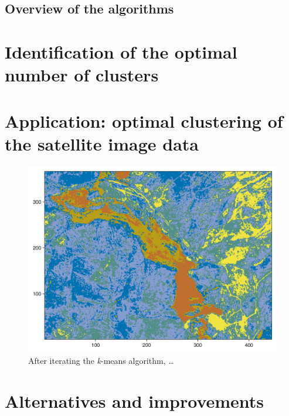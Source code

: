 \documentclass[
  letterpaper,
]{scrbook}
\begin{document}
\hypertarget{overview-of-the-algorithms}{%
\subsection{Overview of the
algorithms}\label{overview-of-the-algorithms}}

\hypertarget{identification-of-the-optimal-number-of-clusters}{%
\section{Identification of the optimal number of
clusters}\label{identification-of-the-optimal-number-of-clusters}}

\hypertarget{application-optimal-clustering-of-the-satellite-image-data}{%
\section{Application: optimal clustering of the satellite image
data}\label{application-optimal-clustering-of-the-satellite-image-data}}

\begin{figure}

{\centering \includegraphics{chapters/kmeans_files/figure-latex/fig-classified-landscape-output-1.png}

}

\caption{\label{fig-classified-landscape}After iterating the
\emph{k}-means algorithm, \ldots{}}

\end{figure}

\hypertarget{alternatives-and-improvements}{%
\section{Alternatives and
improvements}\label{alternatives-and-improvements}}
\end{document}
